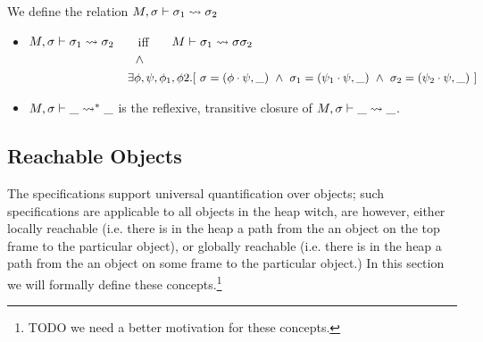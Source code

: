 {
\begin{definition}
\label{def:shallow:term}
We define the relation  $M, \sigma \vdash {\sigma_1} \leadsto \sigma_2$ 

\begin{itemize}
\item
 $M, \sigma \vdash {\sigma_1} \leadsto \sigma_2$ \ \ \ iff \ \ \  $M \vdash \sigma_1 \leadsto {\sigma} {\sigma_2}$\\
$\strut  \hspace{3cm} \wedge $\\
$\strut  \hspace{2.7cm}\ \    \exists \phi,\psi, \phi_1, \phi2.[ \ \sigma = (\phi\cdot\psi,\_) \ \wedge \ \sigma_1 = (\psi_1\cdot \psi, \_)
\ \wedge\ \sigma_2 = (\psi_2\cdot \psi, \_)\ ] $ 
\item
 $M, \sigma \vdash {\_} \leadsto^* \_$ is the reflexive, transitive closure of $M, \sigma \vdash {\_} \leadsto \_$.
\end{itemize}
\end{definition}
}
 

  \subsection{{Reachable  Objects}}
  
{The  \SpecLang  specifications support universal quantification over  objects; such specifications 
are applicable  to all objects in the heap witch, are however, either locally reachable (i.e. there is in the heap a path from the an 
object on the top frame to the particular object), or globally reachable (i.e. there is in the heap a path from the an 
object on some frame to the particular object.)
In this section  we will formally define these concepts.}\footnote{TODO we need a better motivation for these concepts.}
 



